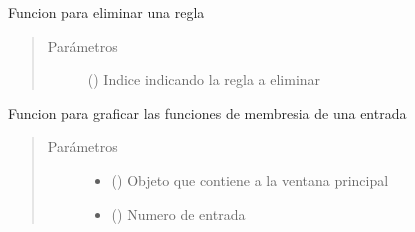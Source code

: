 \documentclass[letterpaper,10pt,spanish]{sphinxmanual}
\begin{document}
\begin{fulllineitems}
\begin{fulllineitems}
\begin{quote}
\begin{description}
\end{description}\end{quote}

\end{fulllineitems}


\begin{fulllineitems}
\label{\detokenize{codigos/rutinas_fuzzy:rutinas_fuzzy.FuzzyController.eliminar_regla}}
Funcion para eliminar una regla
\begin{quote}\begin{description}
\item[{Parámetros}] \leavevmode
{} () \textendash{} Indice indicando la regla a eliminar

\end{description}\end{quote}

\end{fulllineitems}


\begin{fulllineitems}
\label{\detokenize{codigos/rutinas_fuzzy:rutinas_fuzzy.FuzzyController.graficar_mf_in}}
Funcion para graficar las funciones de membresia de una entrada
\begin{quote}\begin{description}
\item[{Parámetros}] \leavevmode\begin{itemize}
\item {} 
 () \textendash{} Objeto que contiene a la ventana principal

\item {} 
 () \textendash{} Numero de entrada

\end{itemize}


\end{description}
\end{quote}
\end{fulllineitems}
\end{fulllineitems}
\end{document}
